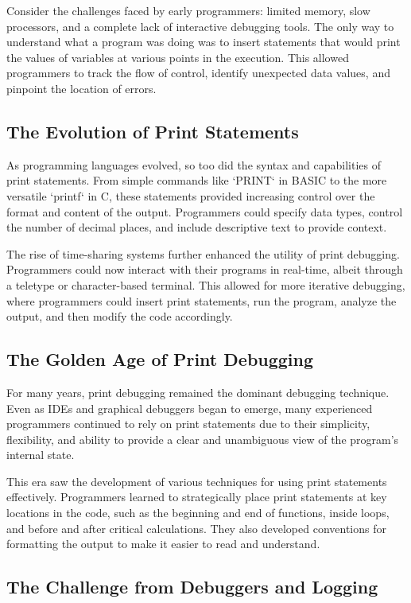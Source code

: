 \documentclass{article}
\begin{document}
Consider the challenges faced by early programmers: limited memory, slow processors, and a complete lack of interactive debugging tools. The only way to understand what a program was doing was to insert statements that would print the values of variables at various points in the execution. This allowed programmers to track the flow of control, identify unexpected data values, and pinpoint the location of errors.

\subsection*{The Evolution of Print Statements}

As programming languages evolved, so too did the syntax and capabilities of print statements. From simple commands like `PRINT` in BASIC to the more versatile `printf` in C, these statements provided increasing control over the format and content of the output. Programmers could specify data types, control the number of decimal places, and include descriptive text to provide context.

The rise of time-sharing systems further enhanced the utility of print debugging. Programmers could now interact with their programs in real-time, albeit through a teletype or character-based terminal. This allowed for more iterative debugging, where programmers could insert print statements, run the program, analyze the output, and then modify the code accordingly.

\subsection*{The Golden Age of Print Debugging}

For many years, print debugging remained the dominant debugging technique. Even as IDEs and graphical debuggers began to emerge, many experienced programmers continued to rely on print statements due to their simplicity, flexibility, and ability to provide a clear and unambiguous view of the program's internal state.

This era saw the development of various techniques for using print statements effectively. Programmers learned to strategically place print statements at key locations in the code, such as the beginning and end of functions, inside loops, and before and after critical calculations. They also developed conventions for formatting the output to make it easier to read and understand.

\subsection*{The Challenge from Debuggers and Logging}
\end{document}
